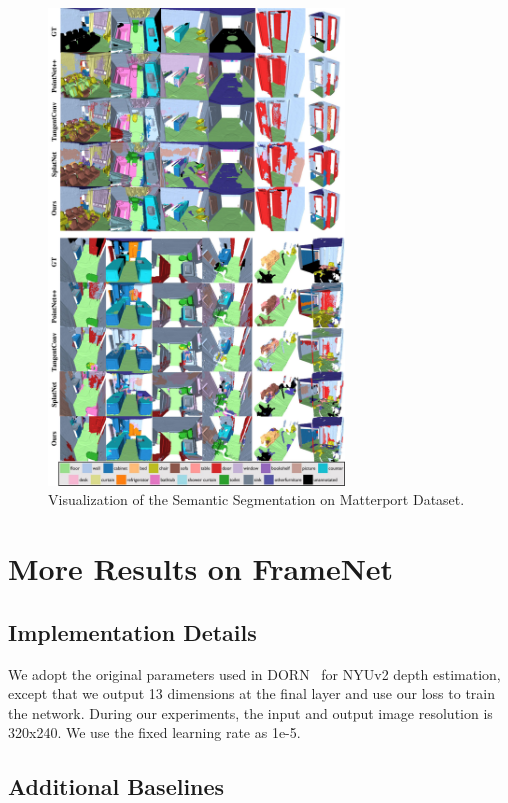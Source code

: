 \begin{figure}
\centering
\includegraphics[width=0.7\textwidth]{texturenet/supplemental/supple_matterport.pdf}
\caption{Visualization of the Semantic Segmentation on Matterport Dataset.}
\label{fig:texturenet-supple-matterport}
\end{figure}

\chapter{More Results on FrameNet}
\section{Implementation Details}
We adopt the original parameters used in DORN~\cite{fu2018deep} for NYUv2 depth estimation, except that we output 13 dimensions at the final layer and use our loss to train the network. During our experiments, the input and output image resolution is 320x240. We use the fixed learning rate as 1e-5.

\section{Additional Baselines}

